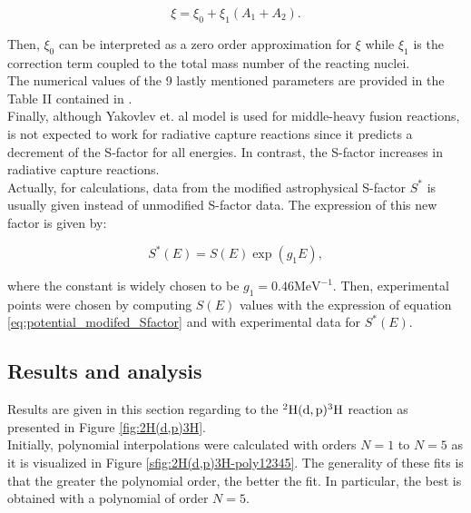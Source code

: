 \documentclass[openany]{book}
\begin{document}
\begin{equation} \label{eq:potential_Yakovlev_xi}
	\xi = 	\xi_0 + \xi_1(A_1 + A_2).
\end{equation}

Then, $\xi_0$ can be interpreted as a zero order approximation for $\xi$ while $\xi_1$ is the correction term coupled to the total mass number of the reacting nuclei. \\

The numerical values of the 9 lastly mentioned parameters are provided in the Table II contained in \cite{yakovlev_beard_gasques_wiescher_2010}. \\

Finally, although Yakovlev et. al model is used for middle-heavy fusion reactions, is not expected to work for radiative capture reactions since it predicts a decrement of the S-factor for all energies. In contrast, the S-factor increases in radiative capture reactions.  \\

Actually, for calculations, data from the modified astrophysical S-factor $S^{*}$ is usually given instead of unmodified S-factor data. The expression of this new factor is given by:

\begin{equation}\label{eq:potential_modifed_Sfactor}
	S^{*}(E) = S(E) \exp {(g_1E)},
\end{equation}

where the constant is widely chosen to be $g_1 = 0.46 \mathrm{MeV^{-1}}$. Then, experimental points were chosen by computing $S(E)$ values with the expression of equation \ref{eq:potential_modifed_Sfactor} and with experimental data for $S^{*}(E)$.


\subsection{Results and analysis} \label{sub:resultsAnalysisNonResonant}

Results are given in this section regarding to the $\mathrm{{}^{2}H(d, p){}^{3}H}$ reaction as presented in Figure \ref{fig:2H(d,p)3H}. \\ 

Initially, polynomial interpolations were calculated with orders $N = 1$ to $N = 5$ as it is visualized in Figure \ref{sfig:2H(d,p)3H-poly12345}. The generality of these fits is that the greater the polynomial order, the better the fit. In particular, the best is obtained with a polynomial of order $N = 5$.  \\
\end{document}
